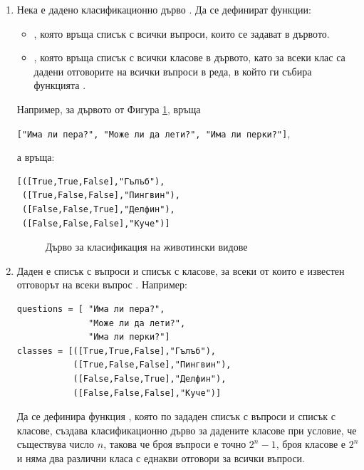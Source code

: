 \begin{enumerate}[resume]
	\item Нека е дадено класификационно дърво . Да се дефинират функции:
	\begin{itemize}
		\item {}, която връща списък с всички въпроси, които се задават в дървото.
		\item {}, която връща списък с всички класове в дървото, като за всеки клас са дадени отговорите на всички въпроси в реда, в който ги събира функцията .
	\end{itemize}
	Например, за дървото от Фигура \ref{fig:decisiontree},  връща 
	
	\verb#["Има ли пера?", "Може ли да лети?", "Има ли перки?"]#,
	
	а  връща:
\begin{verbatim}
[([True,True,False],"Гълъб"),
 ([True,False,False],"Пингвин"),
 ([False,False,True],"Делфин"),
 ([False,False,False],"Куче")]
\end{verbatim}


\begin{figure}[h]
	\centering
{}
	\caption{Дърво за класификация на животински видове}
	\label{fig:decisiontree}
\end{figure}

	
	\item Даден е списък с въпроси  и списък с класове, за всеки от които е известен отговорът на всеки въпрос . Например:
\begin{verbatim}
questions = [ "Има ли пера?", 
              "Може ли да лети?", 
              "Има ли перки?"]
classes = [([True,True,False],"Гълъб"),
           ([True,False,False],"Пингвин"),
           ([False,False,True],"Делфин"),
           ([False,False,False],"Куче")]
\end{verbatim}
Да се дефинира функция , която по зададен списък с въпроси и списък с класове, създава класификационно дърво за дадените класове при условие, че съществува число $n$, такова че броя въпроси е точно $2^n-1$, броя класове е $2^n$ и няма два различни класа с еднакви отговори за всички въпроси.


\end{enumerate}
